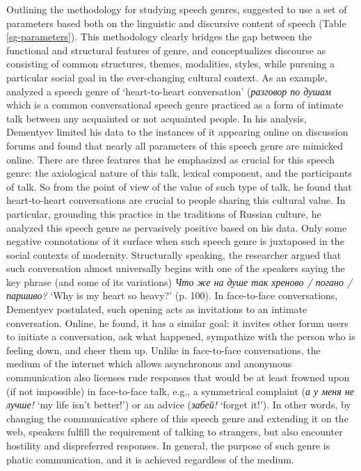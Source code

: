 \documentclass[12pt, draft]{article}
\begin{document}
Outlining the methodology for studying speech genres, \textcite{dementyev2015} suggested to use a set of parameters based both on the linguistic and discursive content of speech (Table \ref{sg-parameters}). This methodology clearly bridges the gap between the functional and structural features of genre, and conceptualizes discourse as consisting of common structures, themes, modalities, styles, while pursuing a particular social goal in the ever-changing cultural context. As an example, \textcite{dementyev2015} analyzed a speech genre of `heart-to-heart conversation' (\foreignlanguage{russian}{\textit{разговор по душам}} which is a common conversational speech genre practiced as a form of intimate talk between any acquainted or not acquainted people. In his analysis, Dementyev limited his data to the instances of it appearing online on discussion forums and found that nearly all parameters of this speech genre are mimicked online. There are three features that he emphasized as crucial for this speech genre: the axiological nature of this talk, lexical component, and the participants of talk. So from the point of view of the value of such type of talk, he found that heart-to-heart conversations are crucial to people sharing this cultural value. In particular, grounding this practice in the traditions of Russian culture, he analyzed this speech genre as pervasively positive based on his data. Only some negative connotations of it surface when such speech genre is juxtaposed in the social contexts of modernity. Structurally speaking, the researcher argued that such conversation almost universally begins with one of the speakers saying the key phrase (and some of its variations) \foreignlanguage{russian}{\textit{Что же на душе так хреново / погано / паршиво?}} `Why is my heart so heavy?' (p. 100). In face-to-face conversations, Dementyev postulated, such  opening acts as  invitations to an intimate conversation. Online, he found, it has a similar goal: it invites other forum users to initiate a conversation, ask what happened, sympathize with the person who is feeling down, and cheer them up. Unlike in face-to-face conversations, the medium of the internet which allows asynchronous and anonymous communication also licenses rude responses that would be at least frowned upon (if not impossible) in face-to-face talk, e.g., a symmetrical complaint (\foreignlanguage{russian}{\textit{а у меня не лучше!} `my life isn't better!'}) or an advice (\foreignlanguage{russian}{\textit{забей!}} `forget it!'). In other words, by changing the communicative sphere of this speech genre and extending it on the web, speakers fulfill the requirement of talking to strangers, but also encounter hostility and dispreferred responses. In general, the purpose of such genre is phatic communication, and it is achieved regardless of the medium.
\end{document}
